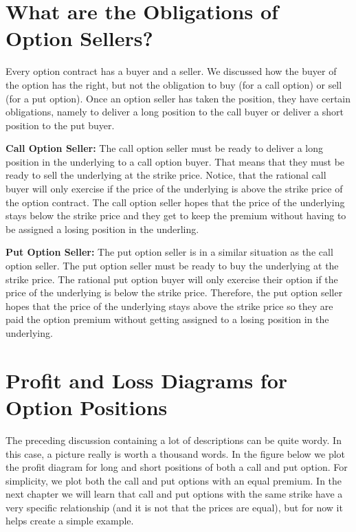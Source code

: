 \documentclass[
  letterpaper,
  DIV=11,
  numbers=noendperiod]{scrreprt}
\begin{document}
\hypertarget{what-are-the-obligations-of-option-sellers}{%
\section{What are the Obligations of Option
Sellers?}\label{what-are-the-obligations-of-option-sellers}}

Every option contract has a buyer and a seller. We discussed how the
buyer of the option has the right, but not the obligation to buy (for a
call option) or sell (for a put option). Once an option seller has taken
the position, they have certain obligations, namely to deliver a long
position to the call buyer or deliver a short position to the put buyer.

\textbf{Call Option Seller:} The call option seller must be ready to
deliver a long position in the underlying to a call option buyer. That
means that they must be ready to sell the underlying at the strike
price. Notice, that the rational call buyer will only exercise if the
price of the underlying is above the strike price of the option
contract. The call option seller hopes that the price of the underlying
stays below the strike price and they get to keep the premium without
having to be assigned a losing position in the underling.

\textbf{Put Option Seller:} The put option seller is in a similar
situation as the call option seller. The put option seller must be ready
to buy the underlying at the strike price. The rational put option buyer
will only exercise their option if the price of the underlying is below
the strike price. Therefore, the put option seller hopes that the price
of the underlying stays above the strike price so they are paid the
option premium without getting assigned to a losing position in the
underlying.

\hypertarget{profit-and-loss-diagrams-for-option-positions}{%
\section{\texorpdfstring{\textbf{Profit and Loss Diagrams for Option
Positions}}{Profit and Loss Diagrams for Option Positions}}\label{profit-and-loss-diagrams-for-option-positions}}

The preceding discussion containing a lot of descriptions can be quite
wordy. In this case, a picture really is worth a thousand words. In the
figure below we plot the profit diagram for long and short positions of
both a call and put option. For simplicity, we plot both the call and
put options with an equal premium. In the next chapter we will learn
that call and put options with the same strike have a very specific
relationship (and it is not that the prices are equal), but for now it
helps create a simple example.
\end{document}
